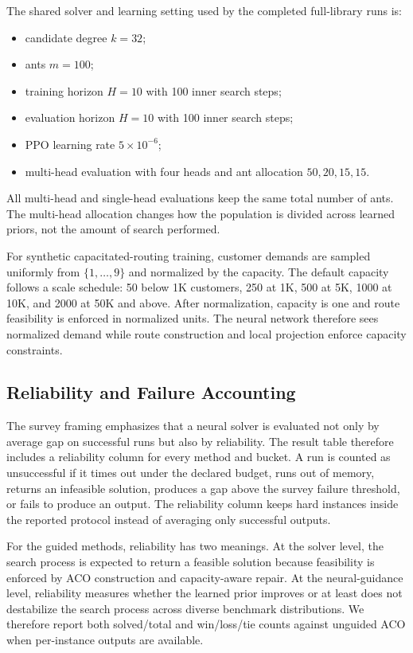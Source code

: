 \documentclass[11pt]{article}
\begin{document}
The shared solver and learning setting used by the completed full-library runs is:
\begin{itemize}
    \item candidate degree $k=32$;
    \item ants $m=100$;
    \item training horizon $H=10$ with 100 inner search steps;
    \item evaluation horizon $H=10$ with 100 inner search steps;
    \item PPO learning rate $5\times 10^{-6}$;
    \item multi-head evaluation with four heads and ant allocation $50,20,15,15$.
\end{itemize}
All multi-head and single-head evaluations keep the same total number of ants.
The multi-head allocation changes how the population is divided across learned priors, not the amount of search performed.

For synthetic capacitated-routing training, customer demands are sampled uniformly from $\{1,\ldots,9\}$ and normalized by the capacity.
The default capacity follows a scale schedule: 50 below 1K customers, 250 at 1K, 500 at 5K, 1000 at 10K, and 2000 at 50K and above.
After normalization, capacity is one and route feasibility is enforced in normalized units.
The neural network therefore sees normalized demand while route construction and local projection enforce capacity constraints.

\subsection{Reliability and Failure Accounting}
\label{sec:reliability}

The survey framing emphasizes that a neural solver is evaluated not only by average gap on successful runs but also by reliability.
The result table therefore includes a reliability column for every method and bucket.
A run is counted as unsuccessful if it times out under the declared budget, runs out of memory, returns an infeasible solution, produces a gap above the survey failure threshold, or fails to produce an output.
The reliability column keeps hard instances inside the reported protocol instead of averaging only successful outputs.

For the guided methods, reliability has two meanings.
At the solver level, the search process is expected to return a feasible solution because feasibility is enforced by ACO construction and capacity-aware repair.
At the neural-guidance level, reliability measures whether the learned prior improves or at least does not destabilize the search process across diverse benchmark distributions.
We therefore report both solved/total and win/loss/tie counts against unguided ACO when per-instance outputs are available.
\end{document}
